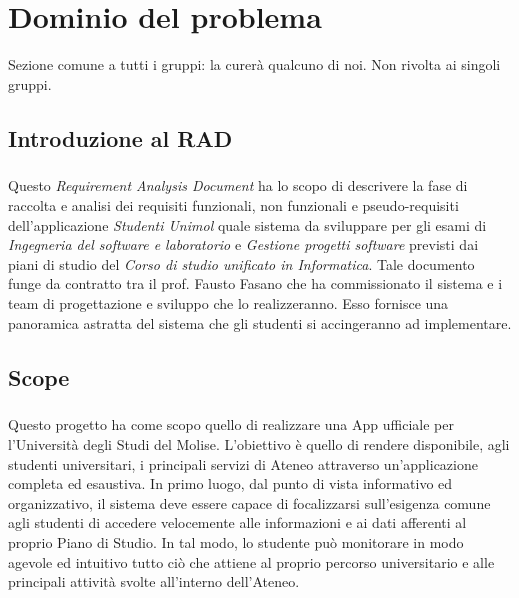 
\chapter{Dominio del problema}
\label{ref:Introduzione}
Sezione comune a tutti i gruppi: la curerà qualcuno di noi. Non rivolta ai singoli gruppi.

\section{Introduzione al RAD}

\paragraph{}
Questo \textit{Requirement Analysis Document} ha lo scopo di descrivere la fase di raccolta e analisi dei requisiti funzionali, non funzionali e pseudo-requisiti dell'applicazione \textit{Studenti Unimol} quale sistema da sviluppare per gli esami di \textit{Ingegneria del software e laboratorio} e \textit{Gestione progetti software} previsti dai piani di studio del \textit{Corso di studio unificato in Informatica}. Tale documento funge da contratto tra il prof. Fausto Fasano che ha commissionato il sistema e i team di progettazione e sviluppo che lo realizzeranno. Esso fornisce una panoramica astratta del sistema che gli studenti si accingeranno ad implementare.

\section{Scope}

\paragraph{}
Questo progetto ha come scopo quello di realizzare una App ufficiale per l’Università degli Studi del Molise. L’obiettivo è quello di rendere disponibile, agli studenti universitari, i principali servizi di Ateneo attraverso un’applicazione completa ed esaustiva.
In primo luogo, dal punto di vista informativo ed organizzativo, il sistema deve essere capace di focalizzarsi sull’esigenza comune agli studenti di accedere velocemente alle informazioni e ai dati afferenti al proprio Piano di Studio. In tal modo, lo studente può monitorare in modo agevole ed intuitivo tutto ciò che attiene al proprio percorso universitario e alle principali attività svolte all'interno dell'Ateneo.

